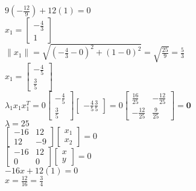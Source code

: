 \documentclass{article}
\renewcommand{\(}{\left(}
\renewcommand{\)}{\right)}
\theoremstyle{plain}
\theoremstyle{plain}
\theoremstyle{definition}
\begin{document}
\begin{enumerate}[label*=\arabic*.,ref=\arabic*]
\begin{shaded}
$9(-\frac{12}{9}) + 12(1) = 0$ \\

$x_1 = \begin{bmatrix} -\frac{4}{3} \\ 1 \end{bmatrix}$ \\

$\lVert x_1 \rVert = \sqrt{(-\frac{4}{3} - 0)^2 + (1 - 0)^2} = \sqrt{\frac{25}{9}} = \frac{5}{3}$ \\

$ x_1 = \begin{bmatrix} -\frac{4}{5} \\ \frac{3}{5} \end{bmatrix}$ \\

$\lambda_1x_1x_1^T = 0 \begin{bmatrix} -\frac{4}{5} \\ \frac{3}{5} \end{bmatrix} \begin{bmatrix} -\frac{4}{5} \frac{3}{5} \end{bmatrix} = 0 \begin{bmatrix} \frac{16}{25} & -\frac{12}{25} \\ -\frac{12}{25} & \frac{9}{25} \end{bmatrix} = \mathbf{0}$ \\

$\lambda = 25$ \\

$\begin{bmatrix} -16 & 12 \\ 12 & -9 \end{bmatrix} \begin{bmatrix} x_1 \\ x_2 \end{bmatrix} = 0$ \\

$\begin{bmatrix} -16 & 12 \\ 0 & 0 \end{bmatrix} \begin{bmatrix} x \\ y \end{bmatrix} = 0$ \\

$-16x + 12(1) = 0$ \\

$x = \frac{12}{16} = \frac{3}{4}$ \\


\end{shaded}
\end{enumerate}
\end{document}
